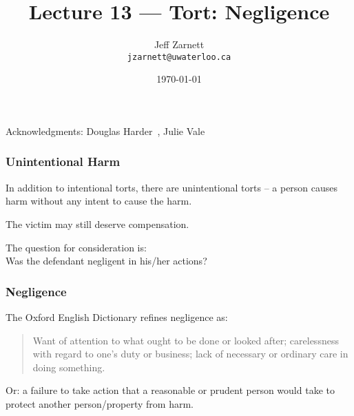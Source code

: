 

\title{Lecture 13 --- Tort: Negligence }

\author{Jeff Zarnett \\ \small \texttt{jzarnett@uwaterloo.ca}}
\date{\today}




\begin{frame}
  \titlepage

\begin{center}
  \small{Acknowledgments: Douglas Harder~\cite{dwh}, Julie Vale~\cite{jv}}
  \end{center}
\end{frame}



\begin{frame}
\frametitle{Unintentional Harm}

In addition to intentional torts, there are unintentional torts -- a person causes harm without any intent to cause the harm.

The victim may still deserve compensation.

The question for consideration is:\\
\quad Was the defendant \alert{negligent} in his/her actions?

\end{frame}



\begin{frame}
\frametitle{Negligence}

The Oxford English Dictionary refines negligence as:

\begin{quote}
Want of attention to what ought to be done or looked after; carelessness with regard to one's duty or business; lack of necessary or ordinary care in doing something.
\end{quote}

Or: a failure to take action that a reasonable or prudent person would take to protect another person/property from harm.

\end{frame}



